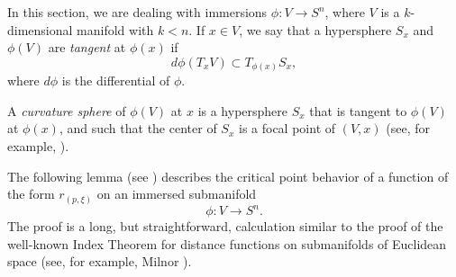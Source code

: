 \documentclass[12pt]{article}
\begin{document}
In this section, we are dealing with immersions $\phi: V \rightarrow S^n$, where $V$ is a $k$-dimensional manifold
with $k < n$.  If $x \in V$, we say that a hypersphere $S_x$ and $\phi (V)$ are {\em tangent} at $\phi (x)$ if 
\begin{displaymath}
d\phi (T_x V) \subset T_{\phi(x)} S_x,
\end{displaymath}
where $d\phi$ is the differential of $\phi$.  

A {\em curvature sphere} of $\phi(V)$ at $x$ is
a hypersphere $S_x$ that is tangent to $\phi (V)$ at $\phi (x)$, and
such that the center of $S_x$ is a focal point of $(V,x)$
(see, for example, \cite[pp. 11--20]{CR8}).

The following lemma (see \cite[pp. 84--88]{Cec1})
describes the critical point behavior of a function of the form $r_{(p,\xi)}$ on an immersed
submanifold 
\begin{displaymath}
\phi: V \rightarrow S^n.
\end{displaymath}   
The proof is a long, but straightforward, calculation
similar to the proof of the well-known Index Theorem for distance functions 
on submanifolds of Euclidean space (see, for example, Milnor \cite[pp. 32--38]{Mil}).
\end{document}
